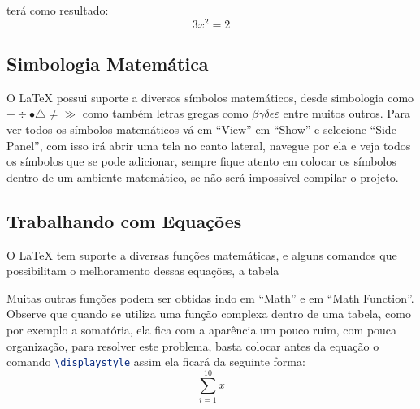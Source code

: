 terá como resultado:
\[
3x^2=2
\]
\subsection{Simbologia Matemática}
O LaTeX possui suporte a diversos símbolos matemáticos, desde simbologia como $\pm \div \bullet \bigtriangleup \neq \gg$ como também letras gregas como $\beta \gamma \delta \epsilon \varepsilon$ entre muitos outros. Para ver todos os símbolos matemáticos vá em ``View'' em ``Show'' e selecione ``Side Panel'', com isso irá abrir uma tela no canto lateral, navegue por ela e veja todos os símbolos que se pode adicionar, sempre fique atento em colocar os símbolos dentro de um ambiente matemático, se não será impossível compilar o projeto.
\subsection{Trabalhando com Equações}
O LaTeX tem suporte a diversas funções matemáticas, e alguns comandos que possibilitam o melhoramento dessas equações, a tabela

\begin{table}[htb]
\end{table}

Muitas outras funções podem ser obtidas indo em ``Math'' e em ``Math Function''. Observe que quando se utiliza uma função complexa dentro de uma tabela, como por exemplo a somatória, ela fica com a aparência um pouco ruim, com pouca organização, para resolver este problema, basta colocar antes da equação o comando \lstinline[language=TeX]|\displaystyle| assim ela ficará da seguinte forma:
\[
\sum_{i=1}^{10}{x}
\]


